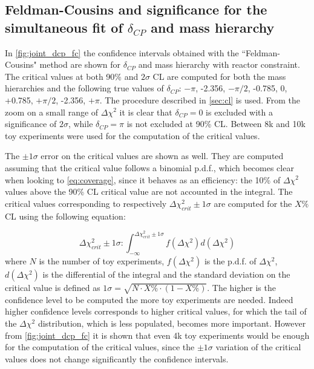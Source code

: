 \subsection {Feldman-Cousins and significance for the simultaneous fit of $\delta_{CP}$ and mass hierarchy}
\label{sec:fc_significance}


In \cref{fig:joint_dcp_fc} the confidence intervals obtained with the ``Feldman-Cousins" method
are shown for $\delta_{CP}$ and mass hierarchy with reactor constraint.
The critical values at both 90\% and $2\sigma$ CL are computed
for both the mass hierarchies and the following true values of $\delta_{CP}$: 
$-\pi$, -2.356, $-\pi/2$, -0.785, 0, +0.785, $+\pi/2$, -2.356, $+\pi$. 
The procedure described in \cref{sec:cl} is used.
From the zoom on a small range of $\Delta \chi^2$ it is clear that $\delta_{CP}=0$ is excluded
with a significance of $2\sigma$, while $\delta_{CP}= \pi$ is not excluded at 90\% CL.
Between 8k and 10k toy experiments were used for the computation of the critical values.

The $\pm 1 \sigma$ error on the critical values are shown as well.
They are computed assuming that the critical value follows a binomial p.d.f.,
which becomes clear when looking to \cref{eq:coverage},
since it behaves as an efficiency:
the 10\% of $\Delta \chi^2$ values above the 90\% CL critical value are not accounted
in the integral.
The critical values corresponding to respectively $\Delta \chi^2_{crit} \pm 1\sigma$ 
are computed for the $X\%$ CL using the following equation: 
	
\begin{equation} \label{eq:def_crit_val_error}
\Delta \chi^2_{crit} \pm 1\sigma: \int_{-\infty}^{\Delta \chi^2_{crit} \pm 1\sigma} f(\Delta \chi^2) d( \Delta \chi^2) %
\end{equation}		
where $N$ is the number of toy experiments,
$f(\Delta \chi^2)$ is the p.d.f. of $\Delta \chi^2$,
$d( \Delta \chi^2)$ is the differential of the integral
and the standard deviation on the critical value 
is defined as $1\sigma = \sqrt{N \cdot X\% \cdot (1-X\%)} $.
The higher is the confidence level to be computed the more toy experiments are needed.
Indeed higher confidence levels corresponds to higher critical values, for 
which the tail of the $\Delta \chi^2$ distribution, which is less populated, becomes more important.  
However from \cref{fig:joint_dcp_fc} it is shown that even 4k toy experiments
would be enough for the computation of the critical values, since the $\pm 1 \sigma$ 
variation of the critical values does not change significantly the confidence intervals. 


